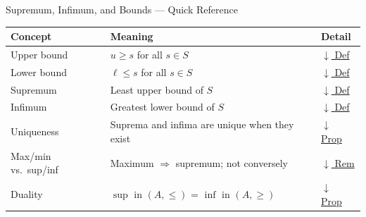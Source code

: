 

\begin{toolkitbox}{Supremum, Infimum, and Bounds --- Quick Reference}
\small
\begin{tabular}{l l l}
\toprule
\textbf{Concept} & \textbf{Meaning} & \textbf{Detail} \\
\midrule
Upper bound       & $u \geq s$ for all $s \in S$                       & \hyperref[def:bounds]{$\downarrow$ Def} \\
Lower bound       & $\ell \leq s$ for all $s \in S$                    & \hyperref[def:bounds]{$\downarrow$ Def} \\
Supremum          & Least upper bound of $S$                           & \hyperref[def:sup-inf]{$\downarrow$ Def} \\
Infimum           & Greatest lower bound of $S$                        & \hyperref[def:sup-inf]{$\downarrow$ Def} \\
Uniqueness        & Suprema and infima are unique when they exist       & \hyperref[prop:sup-unique]{$\downarrow$ Prop} \\
Max/min vs.\ sup/inf & Maximum $\Rightarrow$ supremum; not conversely & \hyperref[rem:max-vs-sup]{$\downarrow$ Rem} \\
Duality           & $\sup$ in $(A,\leq)$ = $\inf$ in $(A,\geq)$        & \hyperref[prop:sup-inf-duality]{$\downarrow$ Prop} \\
\bottomrule
\end{tabular}
\end{toolkitbox}



